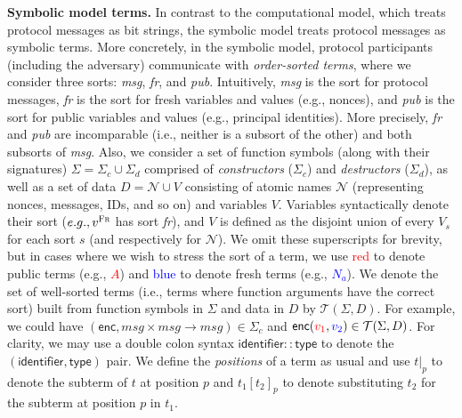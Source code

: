 \documentclass{article}
\theoremstyle{definition}
\newcommand{\blue}[1]{\textcolor{blue}{#1}}
\newcommand{\red}[1]{\textcolor{red}{#1}}
\begin{document}
\textbf{Symbolic model terms.} 
In contrast to the computational model, which treats protocol messages as bit strings, 
the symbolic model treats protocol messages as symbolic terms.
More concretely, in the symbolic model, protocol participants (including the adversary) 
communicate with \textit{order-sorted terms}, where we consider three sorts: \emph{msg}, \emph{fr}, and \emph{pub}.
Intuitively, \emph{msg} is the sort for protocol messages,
\emph{fr} is the sort for fresh variables and values (e.g., nonces), and 
\emph{pub} is the sort for public variables and values (e.g., principal identities).
More precisely, \emph{fr} and \emph{pub} are incomparable (i.e., neither is a subsort of the other) 
and both subsorts of \emph{msg}. 
Also, we consider a set of function symbols (along with their signatures) 
$\Sigma = \Sigma_c \cup \Sigma_d$ comprised of \textit{constructors} ($\Sigma_c$) and 
\textit{destructors} ($\Sigma_d$), as well as a set of data $D = \mathcal{N} \cup V$ 
consisting of atomic names $\mathcal{N}$ (representing nonces, messages, IDs, and so on) and variables $V$. 
Variables syntactically denote their sort ($e.g., v^{\textsc{Fr}}$ has sort \textit{fr}), 
and $V$ is defined as the disjoint union of every $V_s$ for each sort $s$ (and respectively for $\mathcal{N}$).
We omit these superscripts for brevity, 
but in cases where we wish to stress the sort of a term, 
we use \red{red} to denote public terms (e.g., \red{$A$}) and
\blue{blue} to denote fresh terms (e.g., \blue{$N_a$}).
We denote the set of well-sorted terms (i.e., terms where function arguments have the correct sort) 
built from function symbols in $\Sigma$ and data in $D$ by $\mathcal{T}(\Sigma, D)$.
For example, we could have $(\mathsf{enc}, \mathit{msg} \times \mathit{msg} \rightarrow \mathit{msg}) \in \Sigma_c$ 
and $\mathsf{enc}(\red{v_1}, \blue{v_2}) \in \mathcal{T}(\Sigma, D)$. 
For clarity, we may use a double colon syntax $\mathsf{identifier} :: \mathsf{type}$ to denote the 
$(\mathsf{identifier}, \mathsf{type})$ pair. 
We define the \emph{positions} of a term as usual and use $t|_p$ to denote the subterm of $t$ 
at position $p$ and $t_1[t_2]_p$ to denote substituting $t_2$ for the subterm at position $p$ in $t_1$.
\end{document}
